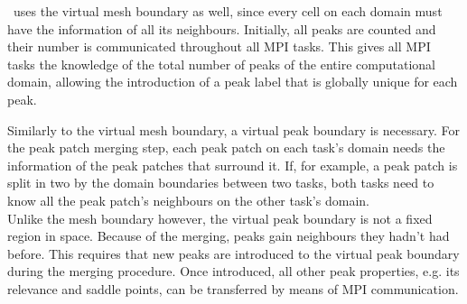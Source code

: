 \phew\ uses the virtual mesh boundary as well, since every cell on each domain must have the information of all its neighbours.
%
Initially, all peaks are counted and their number is communicated throughout all MPI tasks.
This gives all MPI tasks the knowledge of the total number of peaks of the entire computational domain, allowing the introduction of a peak label that is globally unique for each peak. 

Similarly to the virtual mesh boundary, a virtual peak boundary is necessary.
For the peak patch merging step, each peak patch on each task's domain needs the information of the peak patches that surround it.
If, for example, a peak patch is split in two by the domain boundaries between two tasks, both tasks need to know all the peak patch's neighbours on the other task's domain.\\
%
Unlike the mesh boundary however, the virtual peak boundary is not a fixed region in space.
Because of the merging, peaks gain neighbours they hadn't had before.
This requires that new peaks are introduced to the virtual peak boundary during the merging procedure.
Once introduced, all other peak properties, e.g. its relevance and saddle points, can be transferred by means of MPI communication.

